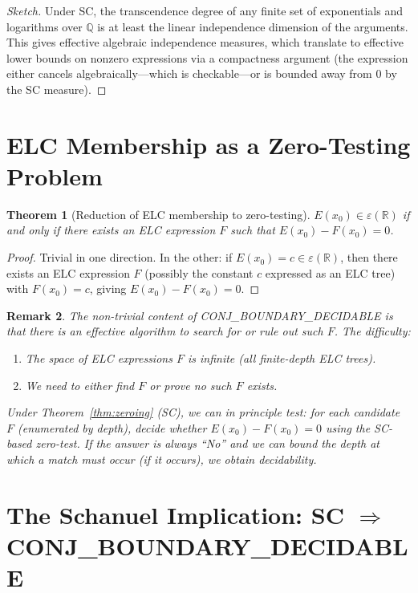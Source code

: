 \documentclass[11pt]{article}
\newtheorem{theorem}{Theorem}
\newtheorem{remark}[theorem]{Remark}
\begin{document}
\begin{proof}[Sketch]
Under SC, the transcendence degree of any finite set of exponentials and logarithms
over $\mathbb{Q}$ is at least the linear independence dimension of the arguments.
This gives effective algebraic independence measures, which translate to effective
lower bounds on nonzero expressions via a compactness argument (the expression either
cancels algebraically---which is checkable---or is bounded away from $0$ by the SC measure).
\end{proof}

\section{ELC Membership as a Zero-Testing Problem}

\begin{theorem}[Reduction of ELC membership to zero-testing]
\label{thm:reduction}
$E(x_0)\in\varepsilon(\mathbb{R})$ if and only if there exists an ELC expression $F$
such that $E(x_0)-F(x_0)=0$.
\end{theorem}

\begin{proof}
Trivial in one direction. In the other: if $E(x_0)=c\in\varepsilon(\mathbb{R})$,
then there exists an ELC expression $F$ (possibly the constant $c$ expressed as an ELC tree)
with $F(x_0)=c$, giving $E(x_0)-F(x_0)=0$.
\end{proof}

\begin{remark}
The non-trivial content of CONJ\_BOUNDARY\_DECIDABLE is that there is an \emph{effective}
algorithm to search for or rule out such $F$. The difficulty:
\begin{enumerate}
  \item The space of ELC expressions $F$ is infinite (all finite-depth ELC trees).
  \item We need to either find $F$ or prove no such $F$ exists.
\end{enumerate}
Under Theorem~\ref{thm:zeroing} (SC), we can in principle test:
for each candidate $F$ (enumerated by depth), decide whether $E(x_0)-F(x_0)=0$
using the SC-based zero-test. If the answer is always ``No'' and we can bound
the depth at which a match must occur (if it occurs), we obtain decidability.
\end{remark}

\section{The Schanuel Implication: SC $\Rightarrow$ CONJ\_BOUNDARY\_DECIDABLE}
\end{document}
